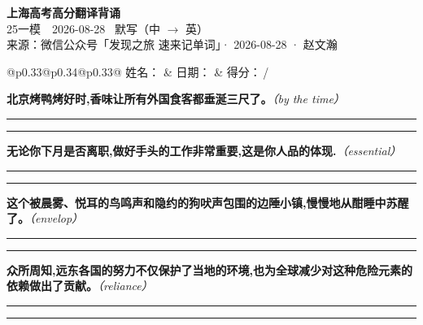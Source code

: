 \documentclass[11pt,a4paper]{article}
\newcommand{\num}[1]{\makebox[1.9em][r]{#1.}\hspace{0.3em}}
\newcommand{\wline}{\noindent\rule{\linewidth}{0.4pt}}
\newcommand{\prompt}[1]{\emph{\textcolor{tipblue}{\small（#1）}}}
\begin{document}
\pagestyle{plain}
\begin{center}
{\LARGE\bfseries 上海高考高分翻译背诵 }\\[0.25em]
{\large 25一模　2026-08-28 \quad\ 默写（中 $\to$ 英）}\\[0.35em]
{\footnotesize 来源：微信公众号「发现之旅 速来记单词」· 2026-08-28 · 赵文瀚}
\end{center}

\vspace{0.4em}
\noindent\begin{tabular}{@{}p{0.33\textwidth}@{}p{0.34\textwidth}@{}p{0.33\textwidth}@{}}
姓名：\underline{\hspace{2.0cm}} & 日期：\underline{\hspace{2.0cm}} & 得分：\underline{\hspace{1.4cm}}\,/ \\
\end{tabular}

\vspace{0.5em}

\vspace{0.8em}
\num{1}\textbf{北京烤鸭烤好时,香味让所有外国食客都垂涎三尺了。}\prompt{by the time}

\vspace{0.3em}

\wline\vspace{0.3em}
\wline

\num{2}\textbf{无论你下月是否离职,做好手头的工作非常重要,这是你人品的体现.}\prompt{essential}

\vspace{0.3em}

\wline\vspace{0.3em}
\wline

\num{3}\textbf{这个被晨雾、悦耳的鸟鸣声和隐约的狗吠声包围的边陲小镇,慢慢地从酣睡中苏醒了。}\prompt{envelop}

\vspace{0.3em}

\wline\vspace{0.3em}
\wline

\num{4}\textbf{众所周知,远东各国的努力不仅保护了当地的环境,也为全球减少对这种危险元素的依赖做出了贡献。}\prompt{reliance}

\vspace{0.3em}

\wline\vspace{0.3em}
\wline
\end{document}
